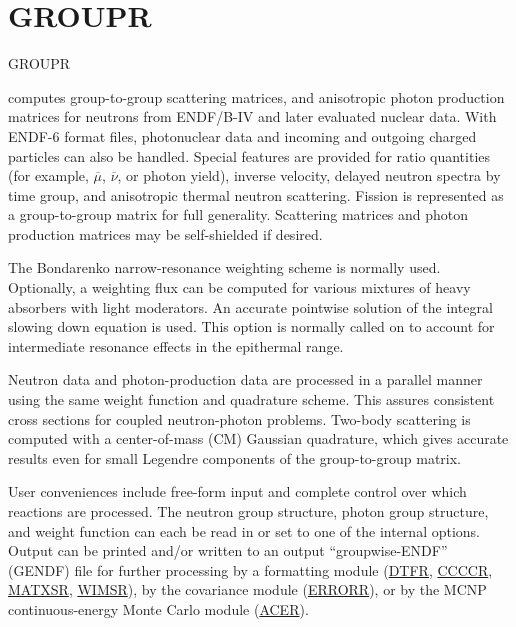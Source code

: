 \section{GROUPR}
\label{sGROUPR}

\hypertarget{sGROUPRhy}{GROUPR}
 computes group-to-group scattering matrices, and
anisotropic photon production matrices for neutrons from ENDF/B-IV and
later evaluated nuclear data.  With ENDF-6
format files, photonuclear data and incoming and outgoing charged
particles can also be handled.  Special features are provided for
ratio quantities (for example, $\overline\mu$, $\overline\nu$, or
photon yield), inverse velocity,
delayed neutron spectra by time group,
and anisotropic thermal neutron scattering.  Fission is represented as
a group-to-group matrix for full generality.  Scattering matrices
and photon production matrices may be self-shielded if desired.

The Bondarenko narrow-resonance weighting
scheme\cite{Bondarenko} is normally
used.  Optionally,
a weighting flux can be computed for various mixtures
of heavy absorbers with light moderators.
An accurate pointwise solution of the integral slowing down equation
is used.  This option is normally called on to account for
intermediate resonance effects in the epithermal range.

Neutron data and photon-production data are processed in a parallel
manner using the same weight function and quadrature scheme.  This
assures consistent cross sections for coupled neutron-photon
problems.  Two-body scattering is computed with a center-of-mass (CM)
Gaussian quadrature, which gives accurate results even for small Legendre
components of the group-to-group matrix.

User conveniences include free-form input and complete control over
which reactions are processed.  The neutron group structure, photon group
structure, and weight function can each be read in or set to one of
the internal options.  Output can be printed and/or written to an
output ``groupwise-ENDF'' (GENDF) file for further processing
by a formatting module (\hyperlink{sDTFRhy}{DTFR},
\hyperlink{sCCCCRhy}{CCCCR},
\hyperlink{sMATXSRhy}{MATXSR},
\hyperlink{sWIMSRhy}{WIMSR}), by the covariance module
(\hyperlink{sERRORRhy}{ERRORR}), or by the MCNP
continuous-energy Monte Carlo
module (\hyperlink{sACERhy}{ACER}).

